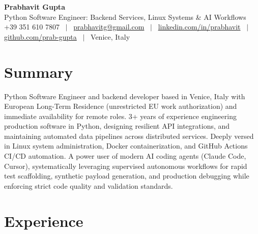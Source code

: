 \documentclass[a4paper,10pt]{article}
\begin{document}
\begin{minipage}[c]{0.80\textwidth}
 {\Huge\bfseries Prabhavit Gupta}\\[3pt]
 {\color{accent}\large Python Software Engineer: Backend Services, Linux Systems \& AI Workflows}\\[6pt]
 {\footnotesize +39 351 610 7807 ~$\vert$~
 \href{mailto:prabhavitg@gmail.com}{prabhavitg@gmail.com} ~$\vert$~
 \href{https://www.linkedin.com/in/prabhavit/}{linkedin.com/in/prabhavit} ~$\vert$~
 \href{https://github.com/prab-gupta}{github.com/prab-gupta} ~$\vert$~
 Venice, Italy}
\end{minipage}\hfill

\section{Summary}
Python Software Engineer and backend developer based in Venice, Italy with European Long-Term Residence (unrestricted EU work authorization) and immediate availability for remote roles. 3+ years of experience engineering production software in Python, designing resilient API integrations, and maintaining automated data pipelines across distributed services. Deeply versed in Linux system administration, Docker containerization, and GitHub Actions CI/CD automation. A power user of modern AI coding agents (Claude Code, Cursor), systematically leveraging supervised autonomous workflows for rapid test scaffolding, synthetic payload generation, and production debugging while enforcing strict code quality and validation standards.

\section{Experience}
\end{document}
